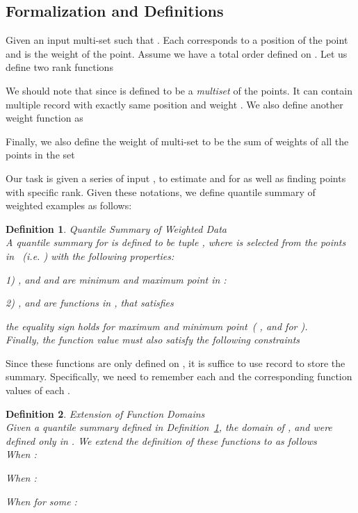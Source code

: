 \documentclass{sig-alternate-05-2015}
\newtheorem{thm:def}{Definition}[section]
\begin{document}
\subsection{Formalization and Definitions}
Given an input multi-set   such that .
Each  corresponds to a position of the point and  is the weight of the point. Assume we have a total order  defined on .
 Let us define  two rank functions 


We should note that since  is defined to be a \emph{multiset} of the points. It can contain multiple record with exactly same position  and weight .
We also define another weight function  as

Finally, we also define the weight of multi-set  to be  the sum of weights of all the points in the set

Our task is given a series of input , to estimate  and  for  as well as finding points
with specific rank.
Given these notations, we define quantile summary of weighted examples as follows:

\begin{thm:def}\label{def:sketch}{Quantile Summary of Weighted Data}\\
A quantile summary for  is defined to be tuple , where
 is selected from the points in ~(i.e. ) with the following properties:

1) , and  and  are minimum and maximum point in :

2) ,  and  are functions in , that satisfies

 the equality sign holds for maximum and minimum point~(
,  and  for ). \\
Finally, the function value must also satisfy the following constraints

\end{thm:def}

Since these functions are only defined on , it is suffice to use  record to store the summary. Specifically, we need to remember each  and the corresponding function values of each .

\begin{thm:def}\label{def:extend}{Extension of Function Domains}\\
Given a quantile summary  defined in Definition~\ref{def:sketch}, the domain of ,  and  were defined only in . We extend the definition of these functions to  as follows \\
\noindent When :

\noindent When :

\noindent When  for some :

\end{thm:def}
\end{document}
